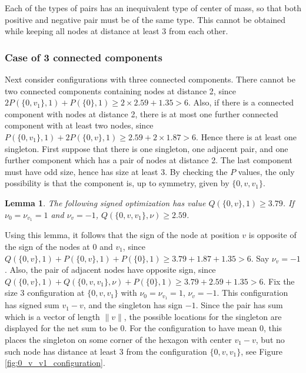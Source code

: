 \documentclass[a4paper, 12pt, notitlepage]{amsart}
\newtheorem{lemma}[theorem]{Lemma}
\theoremstyle{remark}
\begin{document}
 Each of the types of pairs has an inequivalent type of center of mass, so that both positive and negative pair must be of the same type.  This cannot be obtained while keeping all nodes at distance at least 3 from each other.

 
\subsubsection*{Case of 3 connected components}
 Next consider configurations with three connected components.  There cannot be two connected components containing nodes at distance 2, since $2P(\{0,v_1\},1) + P(\{0\}, 1) \geq 2 \times 2.59 + 1.35 > 6$.  Also, if there is a connected component with nodes at distance 2, there is at most one further connected component with at least two nodes, since $P(\{0, v_1\},1) + 2P(\{0,v\},1) \geq 2.59 + 2 \times 1.87> 6$.  Hence there is at least one singleton.  First suppose that there is one singleton, one adjacent pair, and one further component which has a pair of nodes at distance 2.  The last component must have odd size, hence has size at least 3.  By checking the $P$ values, the only possibility is that the component is, up to symmetry, given by $\{0, v, v_1\}$.  
 \begin{lemma}
  The following signed optimization has value $Q(\{0,v\}, 1) \geq 3.79$. If $\nu_0 = \nu_{v_1} = 1$ and $\nu_v = -1$, $Q(\{0,v,v_1\}, \nu) \geq 2.59$.
 \end{lemma}
Using this lemma, it follows that the sign of the node at position $v$ is opposite of the sign of the nodes at 0 and $v_1$, since $Q(\{0,v\},1) + P(\{0,v\},1) + P(\{0\},1) \geq 3.79 + 1.87 + 1.35>6$. Say $\nu_{v}=-1$. Also, the pair of adjacent nodes have opposite sign, since $Q(\{0,v\}, 1) + Q(\{0,v,v_1\},\nu) + P(\{0\},1) \geq 3.79 + 2.59 + 1.35 > 6$. Fix the size 3 configuration at $\{0, v, v_1\}$ with $\nu_0 = \nu_{v_1} = 1$, $\nu_v = -1$.  This configuration has signed sum $v_1 - v$, and the singleton has sign $-1$.  Since the pair has sum which is a vector of length $\|v\|$, the possible locations for the singleton are displayed for the net sum to be 0.
For the configuration to have mean 0, this places the singleton on some corner of the hexagon with center $v_1-v$, but no such node has distance at least 3 from the configuration $\{0, v, v_1\}$, see Figure \ref{fig:0_v_v1_configuration}.
\end{document}
